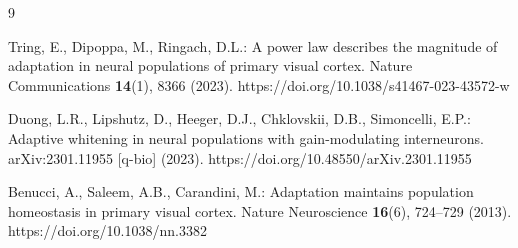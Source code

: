 \documentclass[11pt]{article}
\begin{document}
\begin{thebibliography}{9}
\raggedright

Tring, E., Dipoppa, M., Ringach, D.L.: A power law describes the magnitude of adaptation in neural populations of primary visual cortex. Nature Communications \textbf{14}(1), 8366 (2023). https://doi.org/10.1038/s41467-023-43572-w

Duong, L.R., Lipshutz, D., Heeger, D.J., Chklovskii, D.B., Simoncelli, E.P.: Adaptive whitening in neural populations with gain-modulating interneurons. arXiv:2301.11955 [q-bio] (2023). https://doi.org/10.48550/arXiv.2301.11955

Benucci, A., Saleem, A.B., Carandini, M.: Adaptation maintains population homeostasis in primary visual cortex. Nature Neuroscience \textbf{16}(6), 724--729 (2013). https://doi.org/10.1038/nn.3382

\end{thebibliography}
\end{document}
